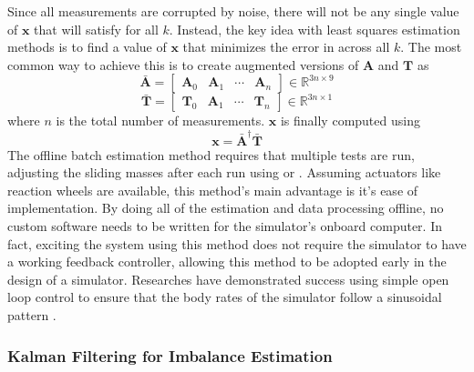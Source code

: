 Since all measurements are corrupted by noise, there will not be any single value of $\bm{x}$ that will satisfy  for all $k$. Instead, the key idea with least squares estimation methods is to find a value of $\bm{x}$ that minimizes the error in  across all $k$. The most common way to achieve this is to create augmented versions of $\bm{A}$ and $\bm{T}$ as
\begin{equation}
    \bar{\bm{A}}=\begin{bmatrix}
        \bm{A}_0 & \bm{A}_1 & \cdots & \bm{A}_n
    \end{bmatrix}\in \mathbb{R}^{3n \times 9}
\end{equation}
\begin{equation}
    \bar{\bm{T}}=\begin{bmatrix}
        \bm{T}_0 & \bm{A}_1 & \cdots & \bm{T}_n
    \end{bmatrix}\in \mathbb{R}^{3n \times 1}
\end{equation}
where $n$ is the total number of measurements. $\bm{x}$ is finally computed using 
\begin{equation}
    \bm{x}=\bar{\bm{A}}^{\dagger}\bar{\bm{T}}
\end{equation}
The offline batch estimation method requires that multiple tests are run, adjusting the sliding masses after each run using  or . Assuming actuators like reaction wheels are available, this method's main advantage is it's ease of implementation. By doing all of the estimation and data processing offline, no custom software needs to be written for the simulator's onboard computer. In fact, exciting the system using this method does not require the simulator to have a working feedback controller, allowing this method to be adopted early in the design of a simulator. Researches have demonstrated success using simple open loop control to ensure that the body rates of the simulator follow a sinusoidal pattern \cite{kim_automatic_2009} \cite{dam_applied_2014} \cite{noauthor_designing_2003}.

\subsubsection{Kalman Filtering for Imbalance Estimation}\label{sec:UKF}

